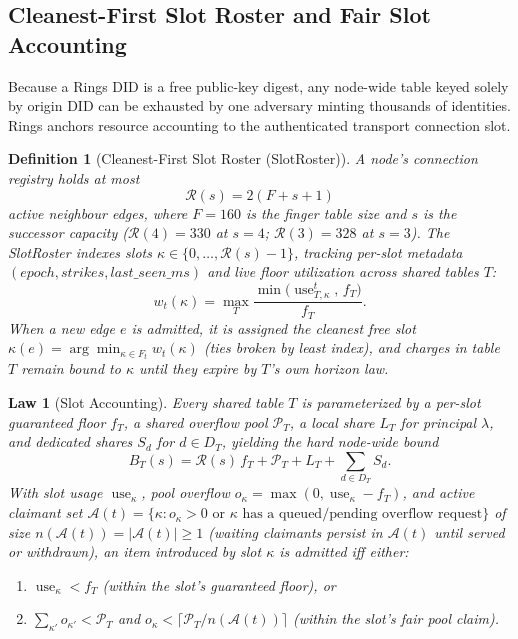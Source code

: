 \documentclass[journal]{IEEEtran}
\newtheorem{definition}{Definition}
\newtheorem{law}{Law}
\DeclareRobustCommand{\code}[1]{{\ttfamily\renewcommand{\_}{\textunderscore\allowbreak}#1}}
\begin{document}
\subsection{Cleanest-First Slot Roster and Fair Slot Accounting}

Because a Rings DID is a free public-key digest, any node-wide table keyed solely
by origin DID can be exhausted by one adversary minting thousands of identities.
Rings anchors resource accounting to the authenticated transport connection slot.

\begin{definition}[Cleanest-First Slot Roster (\code{SlotRoster})]\label{def:slot-roster}
A node's connection registry holds at most
\[
  \mathcal{R}(s)=2(F+s+1)
\]
active neighbour edges, where $F=160$ is the finger table size and $s$ is the
successor capacity ($\mathcal{R}(4)=330$ at $s=4$; $\mathcal{R}(3)=328$ at $s=3$).
The \code{SlotRoster} indexes slots $\kappa\in\{0,\dots,\mathcal{R}(s)-1\}$, tracking
per-slot metadata $(\mathit{epoch},\mathit{strikes},\mathit{last\_seen\_ms})$
and live floor utilization across shared tables $T$:
\[
  w_t(\kappa)=\max_T\frac{\min\bigl(\operatorname{use}^t_{T,\kappa},\,f_T\bigr)}{f_T}.
\]
When a new edge $e$ is admitted, it is assigned the \emph{cleanest} free slot
$\kappa(e)=\arg\min_{\kappa\in F_t}w_t(\kappa)$ (ties broken by least index),
and charges in table $T$ remain bound to $\kappa$ until they expire by $T$'s own
horizon law.
\end{definition}

\begin{law}[Slot Accounting]\label{law:slot-accounting}
Every shared table $T$ is parameterized by a per-slot guaranteed floor $f_T$, a
shared overflow pool $\mathcal{P}_T$, a local share $L_T$ for principal $\lambda$,
and dedicated shares $S_d$ for $d\in D_T$, yielding the hard node-wide bound
\[
  B_T(s)=\mathcal{R}(s)\,f_T+\mathcal{P}_T+L_T+\sum_{d\in D_T}S_d.
\]
With slot usage $\operatorname{use}_\kappa$, pool overflow
$o_\kappa=\max(0,\operatorname{use}_\kappa-f_T)$, and active claimant set
$\mathcal{A}(t)=\{\kappa:o_\kappa>0\text{ or }\kappa\text{ has a queued/pending overflow request}\}$
of size $n(\mathcal{A}(t))=|\mathcal{A}(t)|\ge 1$ (waiting claimants persist in $\mathcal{A}(t)$ until served or withdrawn), an item introduced by slot
$\kappa$ is admitted iff either:
\begin{enumerate}[leftmargin=1.5em]
\item $\operatorname{use}_\kappa<f_T$ (within the slot's guaranteed floor), or
\item $\sum_{\kappa'}o_{\kappa'}<\mathcal{P}_T$ and
$o_\kappa<\bigl\lceil\mathcal{P}_T / n(\mathcal{A}(t))\bigr\rceil$ (within the
slot's fair pool claim).
\end{enumerate}
\end{law}
\end{document}
